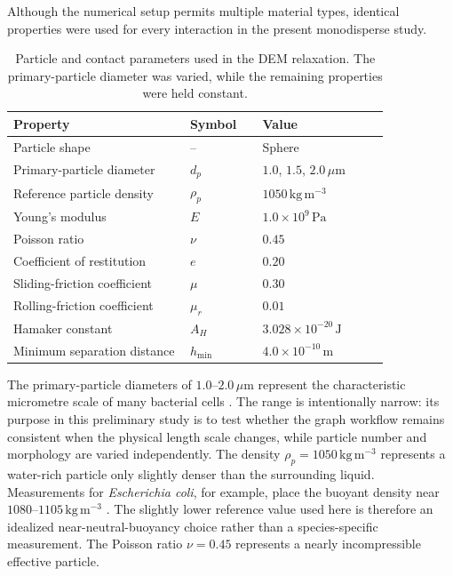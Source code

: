 \documentclass[12pt,a4paper]{article}
\begin{document}
Although the numerical setup permits multiple material types, identical
properties were used for every interaction in the present monodisperse study.
\begin{table}[!tbp]
	\centering
	\caption{Particle and contact parameters used in the DEM relaxation.
		The primary-particle diameter was varied, while the remaining properties
		were held constant.}
	\label{tab:dem_material_parameters}
	\begin{tabular}{p{0.39\linewidth} p{0.16\linewidth} p{0.29\linewidth}}
		\toprule
		\textbf{Property} & \textbf{Symbol} & \textbf{Value} \\
		\midrule
		Particle shape
		& -- & Sphere \\
		Primary-particle diameter
		& $d_p$ & $1.0$, $1.5$, $2.0\,\mu\mathrm{m}$ \\
		Reference particle density
		& $\rho_p$ & $1050\,\mathrm{kg\,m^{-3}}$ \\
		Young's modulus
		& $E$ & $1.0\times10^{9}\,\mathrm{Pa}$ \\
		Poisson ratio
		& $\nu$ & $0.45$ \\
		Coefficient of restitution
		& $e$ & $0.20$ \\
		Sliding-friction coefficient
		& $\mu$ & $0.30$ \\
		Rolling-friction coefficient
		& $\mu_r$ & $0.01$ \\
		Hamaker constant
		& $A_H$ & $3.028\times10^{-20}\,\mathrm{J}$ \\
		Minimum separation distance
		& $h_{\min}$ & $4.0\times10^{-10}\,\mathrm{m}$ \\
		\bottomrule
	\end{tabular}
\end{table}

The primary-particle diameters of $1.0$--$2.0\,\mu\mathrm{m}$ represent the
characteristic micrometre scale of many bacterial cells
\cite{LevinAngert2015}. The range is intentionally narrow:
its purpose in this preliminary study is to test whether the graph workflow
remains consistent when the physical length scale changes, while particle
number and morphology are varied independently. The density
$\rho_p=1050\,\mathrm{kg\,m^{-3}}$ represents a water-rich particle only
slightly denser than the surrounding liquid. Measurements for
\textit{Escherichia coli}, for example, place the buoyant density near
$1080$--$1105\,\mathrm{kg\,m^{-3}}$ \cite{MartinezSalas1981,Woldringh1981}.
The slightly lower reference value used here is therefore an idealized
near-neutral-buoyancy choice rather than a species-specific measurement. The
Poisson ratio $\nu=0.45$ represents a nearly incompressible effective particle.
\end{document}

